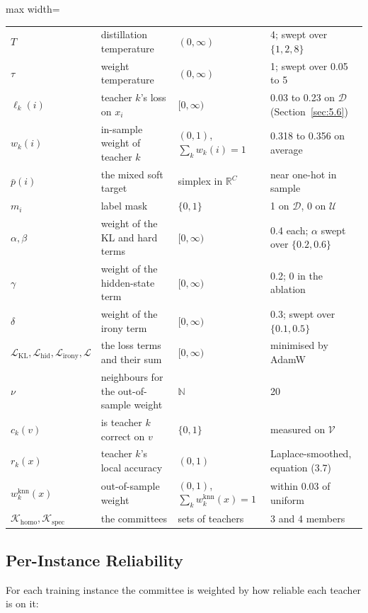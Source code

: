 \begin{table}[htbp]
\begin{adjustbox}{max width=\textwidth}
\begin{tabular}{llll}
$T$ & distillation temperature & $(0, \infty)$ & 4; swept over $\{1, 2, 8\}$ \\
$\tau$ & weight temperature & $(0, \infty)$ & 1; swept over 0.05 to 5 \\
$\ell_k(i)$ & teacher $k$'s loss on $x_i$ & $[0, \infty)$ & 0.03 to 0.23 on $\mathcal{D}$ (Section~\ref{sec:5.6}) \\
$w_k(i)$ & in-sample weight of teacher $k$ & $(0,1)$, $\sum_k w_k(i) = 1$ & 0.318 to 0.356 on average \\
$\bar p(i)$ & the mixed soft target & simplex in $\mathbb{R}^C$ & near one-hot in sample \\
$m_i$ & label mask & $\{0, 1\}$ & 1 on $\mathcal{D}$, 0 on $\mathcal{U}$ \\
$\alpha, \beta$ & weight of the KL and hard terms & $[0, \infty)$ & 0.4 each; $\alpha$ swept over $\{0.2, 0.6\}$ \\
$\gamma$ & weight of the hidden-state term & $[0, \infty)$ & 0.2; 0 in the ablation \\
$\delta$ & weight of the irony term & $[0, \infty)$ & 0.3; swept over $\{0.1, 0.5\}$ \\
$\mathcal{L}_{\mathrm{KL}}, \mathcal{L}_{\mathrm{hid}}, \mathcal{L}_{\mathrm{irony}}, \mathcal{L}$ & the loss terms and their sum & $[0, \infty)$ & minimised by AdamW \\
$\nu$ & neighbours for the out-of-sample weight & $\mathbb{N}$ & 20 \\
$c_k(v)$ & is teacher $k$ correct on $v$ & $\{0, 1\}$ & measured on $\mathcal{V}$ \\
$r_k(x)$ & teacher $k$'s local accuracy & $(0, 1)$ & Laplace-smoothed, equation (3.7) \\
$w_k^{\mathrm{knn}}(x)$ & out-of-sample weight & $(0,1)$, $\sum_k w_k^{\mathrm{knn}}(x) = 1$ & within 0.03 of uniform \\
$\mathcal{K}_{\mathrm{homo}}, \mathcal{K}_{\mathrm{spec}}$ & the committees & sets of teachers & 3 and 4 members \\
\bottomrule
\end{tabular}
\end{adjustbox}
\end{table}

\subsection{Per-Instance Reliability}
\label{sec:3.2}
For each training instance the committee is weighted by how reliable each teacher is on it:

